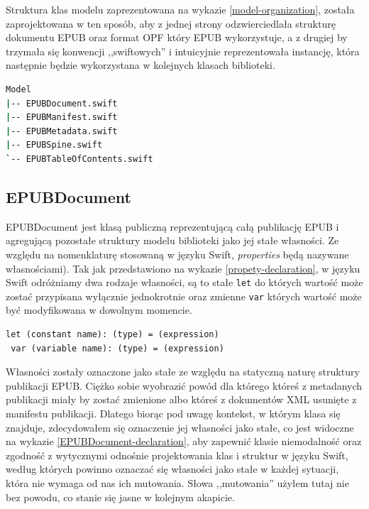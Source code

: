 Struktura klas modelu zaprezentowana na wykazie \ref{model-organization}, została zaprojektowana w ten sposób, aby z jednej strony odzwierciedlała strukturę dokumentu EPUB oraz format OPF który EPUB wykorzystuje, a z drugiej by trzymała się konwencji ,,swiftowych'' i intuicyjnie reprezentowała instancję, która następnie będzie wykorzystana w kolejnych klasach biblioteki.

\begin{lstlisting}[caption={Struktura modelu EPUBKit}, language=bash,label=model-organization]
Model
|-- EPUBDocument.swift
|-- EPUBManifest.swift
|-- EPUBMetadata.swift
|-- EPUBSpine.swift
`-- EPUBTableOfContents.swift
\end{lstlisting}

\subsection{EPUBDocument}
\label{EPUBDocument}

EPUBDocument jest klasą publiczną reprezentującą całą publikację EPUB i agregującą pozostałe struktury modelu biblioteki jako jej stałe własności. Ze względu na nomenklaturę stosowaną w języku Swift, \textit{properties} będą nazywane własnościami). Tak jak przedstawiono na wykazie \ref{propety-declaration}, w języku Swift odróżniamy dwa rodzaje własności, są to stałe \texttt{let} do których wartość może zostać przypisana wyłącznie jednokrotnie oraz zmienne \texttt{var} których wartość może być modyfikowana w dowolnym momencie.

\begin{lstlisting}[caption={Deklaracje własności w Swifcie.\cite{theSwiftProgrammingLanguage}}, language=swift-reference,label=propety-declaration]
 let (constant name): (type) = (expression)
 var (variable name): (type) = (expression)
\end{lstlisting}

Własności zostały oznaczone jako stałe ze względu na statyczną naturę struktury publikacji EPUB. Ciężko sobie wyobrazić powód dla którego któreś z metadanych publikacji miały by zostać zmienione albo któreś z dokumentów XML usunięte z manifestu publikacji. Dlatego biorąc pod uwagę kontekst, w którym klasa się znajduje, zdecydowałem się oznaczenie jej własności jako stałe, co jest widoczne na wykazie \ref{EPUBDocument-declaration}, aby zapewnić klasie niemodalność oraz zgodność z wytycznymi odnośnie projektowania klas i struktur w języku Swift, według których powinno oznaczać się własności jako stałe w każdej sytuacji, która nie wymaga od nas ich mutowania. Słowa ,,mutowania'' użyłem tutaj nie bez powodu, co stanie się jasne w kolejnym akapicie.

